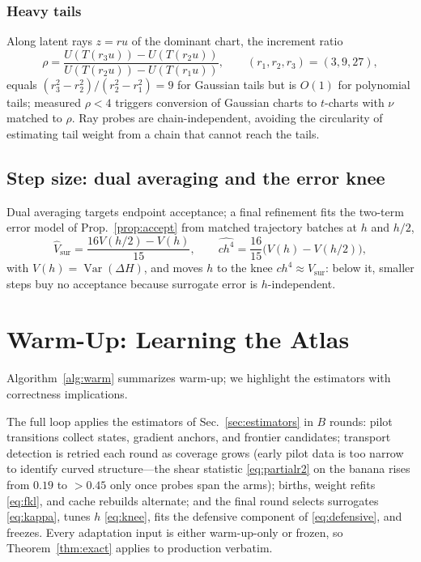 \documentclass[10pt,journal,compsoc]{IEEEtran}
\begin{document}
\subsubsection{Heavy tails} Along latent rays $z=r u$ of the dominant
chart, the increment ratio
\begin{equation}
\rho=\frac{U(T(r_3u))-U(T(r_2u))}{U(T(r_2u))-U(T(r_1u))},
\qquad (r_1,r_2,r_3)=(3,9,27),
\label{eq:ray}
\end{equation}
equals $(r_3^2-r_2^2)/(r_2^2-r_1^2)=9$ for Gaussian tails but is $O(1)$
for polynomial tails; measured $\rho<4$ triggers conversion of Gaussian
charts to $t$-charts with $\nu$ matched to $\rho$. Ray probes are
chain-independent, avoiding the circularity of estimating tail weight from
a chain that cannot reach the tails.

\subsection{Step size: dual averaging and the error knee}
Dual averaging \cite{hoffman2014} targets endpoint acceptance; a final
refinement fits the two-term error model of
Prop.~\ref{prop:accept} from matched trajectory batches at $h$ and $h/2$,
\begin{equation}
\widehat V_{\mathrm{sur}}=\frac{16V(h/2)-V(h)}{15},
\qquad
\widehat{ch^4}=\frac{16}{15}\bigl(V(h)-V(h/2)\bigr),
\label{eq:knee}
\end{equation}
with $V(h)=\operatorname{Var}(\Delta H)$, and moves $h$ to the knee
$ch^4\approx V_{\mathrm{sur}}$: below it, smaller steps buy no acceptance
because surrogate error is $h$-independent.

\section{Warm-Up: Learning the Atlas}\label{sec:warmup}
Algorithm~\ref{alg:warm} summarizes warm-up; we highlight the estimators
with correctness implications.

The full loop applies the estimators of Sec.~\ref{sec:estimators} in $B$
rounds: pilot transitions collect states, gradient anchors, and frontier
candidates; transport detection is retried each round as coverage grows
(early pilot data is too narrow to identify curved structure---the shear
statistic \eqref{eq:partialr2} on the banana rises from $0.19$ to $>0.45$
only once probes span the arms); births, weight refits \eqref{eq:fkl}, and
cache rebuilds alternate; and the final round selects surrogates
\eqref{eq:kappa}, tunes $h$ \eqref{eq:knee}, fits the defensive component
of \eqref{eq:defensive}, and freezes. Every adaptation input is either
warm-up-only or frozen, so Theorem~\ref{thm:exact} applies to production
verbatim.
\end{document}
